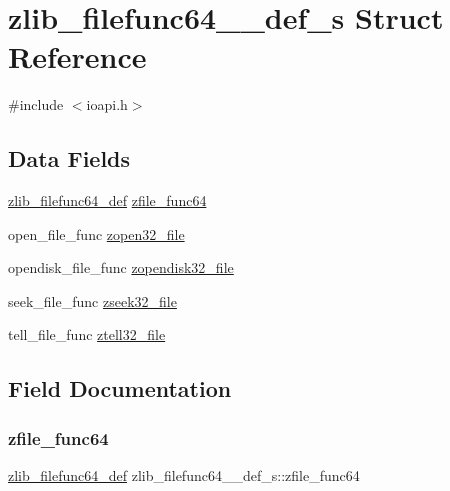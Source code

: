 \hypertarget{structzlib__filefunc64__32__def__s}{}\section{zlib\+\_\+filefunc64\+\_\+\_\+def\+\_\+s Struct Reference}
\label{structzlib__filefunc64__32__def__s}


{\ttfamily \#include $<$ioapi.\+h$>$}

\subsection*{Data Fields}
\begin{DoxyCompactItemize}
\item 
\hyperlink{ioapi_8h_a6be8577ecdaf6c1f57fb75006aa2b56c}{zlib\+\_\+filefunc64\+\_\+def} \hyperlink{structzlib__filefunc64__32__def__s_a5b05687723a1a8cd310a73ab62fc31f5}{zfile\+\_\+func64}
\item 
open\+\_\+file\+\_\+func \hyperlink{structzlib__filefunc64__32__def__s_a784a1cead2df16b1ce5881f32236308a}{zopen32\+\_\+file}
\item 
opendisk\+\_\+file\+\_\+func \hyperlink{structzlib__filefunc64__32__def__s_acf4c70fc762fdccee2ce7bca37996937}{zopendisk32\+\_\+file}
\item 
seek\+\_\+file\+\_\+func \hyperlink{structzlib__filefunc64__32__def__s_a2c6e18405ec9c8b2d482055e9bf06766}{zseek32\+\_\+file}
\item 
tell\+\_\+file\+\_\+func \hyperlink{structzlib__filefunc64__32__def__s_a8ef46da9e69697b4f13cd611523761a8}{ztell32\+\_\+file}
\end{DoxyCompactItemize}


\subsection{Field Documentation}
\mbox{\label{structzlib__filefunc64__32__def__s_a5b05687723a1a8cd310a73ab62fc31f5}} 
\subsubsection{\texorpdfstring{zfile\+\_\+func64}{zfile\_func64}}
{\footnotesize\ttfamily \hyperlink{ioapi_8h_a6be8577ecdaf6c1f57fb75006aa2b56c}{zlib\+\_\+filefunc64\+\_\+def} zlib\+\_\+filefunc64\+\_\+\_\+def\+\_\+s\+::zfile\+\_\+func64}

